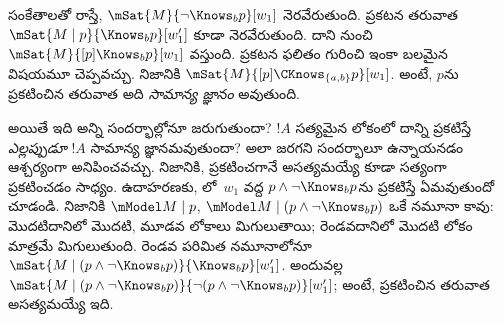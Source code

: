\documentclass[../../../include/open-logic-section]{subfiles}
\begin{document}
సంకేతాలతో రాస్తే, $\mSat{M}{\lnot \Knows_b p}[w_1]$ నెరవేరుతుంది.
ప్రకటన తరువాత $\mSat{M
\mid p}{\Knows_b p}[w'_1]$ కూడా నెరవేరుతుంది. దాని నుంచి
$\mSat{M}{[p] \Knows_b
p}[w_1]$ వస్తుంది. ప్రకటన ఫలితం గురించి ఇంకా
బలమైన విషయమూ చెప్పవచ్చు. నిజానికి
$\mSat{M}{[p]\CKnows_{\{a,b\}} p}[w_1]$.
అంటే, $p$ను ప్రకటించిన తరువాత అది
\emph{సామాన్య జ్ఞానం} అవుతుంది.

అయితే ఇది అన్ని సందర్భాల్లోనూ జరుగుతుందా?
$!A$ సత్యమైన లోకంలో దాన్ని ప్రకటిస్తే \emph{ఎల్లప్పుడూ}
$!A$ సామాన్య జ్ఞానమవుతుందా?
అలా జరగని సందర్భాలూ ఉన్నాయనడం ఆశ్చర్యంగా అనిపించవచ్చు.
నిజానికి, ప్రకటించగానే అసత్యమయ్యే
 కూడా సత్యంగా
ప్రకటించడం సాధ్యం. ఉదాహరణకు,
లో~$w_1$ వద్ద
$p \land \lnot \Knows_b p$ను ప్రకటిస్తే
ఏమవుతుందో చూడండి. నిజానికి $\mModel M \mid p$,
$\mModel M \mid (p \land \lnot \Knows_b p)$
ఒకే నమూనా కావు: మొదటిదానిలో మొదటి, మూడవ లోకాలు
మిగులుతాయి; రెండవదానిలో మొదటి లోకం మాత్రమే మిగులుతుంది.
రెండవ పరిమిత నమూనాలోనూ
$\mSat{M \mid (p \land \lnot \Knows_b p)}{\Knows_b
p}[w'_1]$. అందువల్ల $\mSat{M \mid (p \land \lnot \Knows_b p)}{\lnot
(p \land \lnot \Knows_b p)}[w'_1]$;
అంటే, ప్రకటించిన తరువాత అసత్యమయ్యే
 ఇది.
\end{document}
